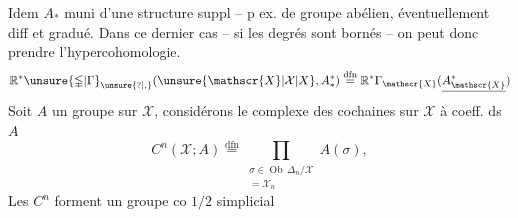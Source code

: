 Idem  $A_*$ muni d'une structure suppl -- p ex. de groupe abélien, éventuellement diff et gradué. Dans ce dernier cas -- si les degrés sont bornés  -- on peut donc prendre l'hypercohomologie.
\[
 \mathbb{R}^*\unsure{\mathbb{\Gamma}|\Gamma}_{\unsure{?|,}}(\unsure{\mathscr{X}|\mathcal{X}|X},A_*^*)\overset{\mathrm{dfn}}{=}
 \mathbb{R}^*\Gamma_{\mathscr{X}}(\underline{A_{\mathscr{X}}^*})
\]
Soit $A$ un groupe sur $\mathscr{X}$, considérons le complexe des cochaines sur $\mathscr{X}$ à coeff. ds $A$
\[
 C^n(\mathscr{X};A)\overset{\mathrm{dfn}}{=}
 \prod_{\substack{\sigma\in\operatorname{Ob}\,\Delta_n/\mathscr{X}\\=\mathscr{X}_n}}A(\sigma),
\]
Les $C^n$ forment un groupe co $1/2$ simplicial

